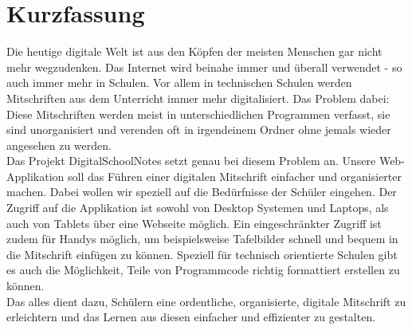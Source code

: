 \section*{Kurzfassung}

Die heutige digitale Welt ist aus den Köpfen der meisten Menschen gar nicht mehr wegzudenken. Das Internet wird beinahe immer und überall verwendet - so auch immer mehr in Schulen. Vor allem in technischen Schulen werden Mitschriften aus dem Unterricht immer mehr digitalisiert. Das Problem dabei: Diese Mitschriften werden meist in unterschiedlichen Programmen verfasst, sie sind unorganisiert und verenden oft in irgendeinem Ordner ohne jemals wieder angesehen zu werden.\\
Das Projekt DigitalSchoolNotes setzt genau bei diesem Problem an. Unsere Web-Applikation soll das Führen einer digitalen Mitschrift einfacher und organisierter machen. Dabei wollen wir speziell auf die Bedürfnisse der Schüler eingehen. Der Zugriff auf die Applikation ist sowohl von Desktop Systemen und Laptops, als auch von Tablets über eine Webseite möglich. Ein eingeschränkter Zugriff ist zudem für Handys möglich, um beispielsweise Tafelbilder schnell und bequem in die Mitschrift einfügen zu können. Speziell für technisch orientierte Schulen gibt es auch die Möglichkeit, Teile von Programmcode richtig formattiert erstellen zu können. \\
Das alles dient dazu, Schülern eine ordentliche, organisierte, digitale Mitschrift zu erleichtern und das Lernen aus diesen einfacher und effizienter zu gestalten.